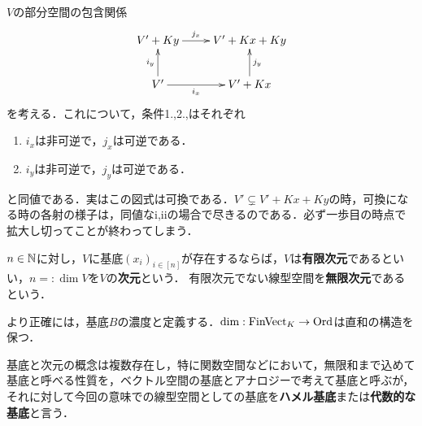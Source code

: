 \documentclass[uplatex, 12pt, dvipdfmx]{jsreport}
\begin{document}
\begin{remark}
    $V$の部分空間の包含関係
    \[\xymatrix{
        V'+Ky\ar[r]^-{j_x}&V'+Kx+Ky\\
        V'\ar[r]_-{i_x}\ar[u]^-{i_y}&V'+Kx\ar[u]_-{j_y}
    }\]
    を考える．これについて，条件1.,2.,はそれぞれ
    \begin{enumerate}[i]
        \item $i_x$は非可逆で，$j_x$は可逆である．
        \item $i_y$は非可逆で，$j_y$は可逆である．
    \end{enumerate}
    と同値である．実はこの図式は可換である．$V'\subsetneq V'+Kx+Ky$の時，可換になる時の各射の様子は，同値なi,iiの場合で尽きるのである．必ず一歩目の時点で拡大し切ってことが終わってしまう．
\end{remark}

\begin{definition}\label{def-dimention}
    $n\in\mathbb{N}$に対し，$V$に基底$(x_i)_{i\in[n]}$が存在するならば，$V$は\textbf{有限次元}であるといい，$n=:\dim V$を$V$の\textbf{次元}という．
    有限次元でない線型空間を\textbf{無限次元}であるという．
\end{definition}
\begin{remark}
    より正確には，基底$B$の濃度と定義する．$\dim:\mathrm{FinVect}_K\to\mathrm{Ord}$は直和の構造を保つ．

    基底と次元の概念は複数存在し，特に関数空間などにおいて，無限和まで込めて基底と呼べる性質を，ベクトル空間の基底とアナロジーで考えて基底と呼ぶが，
    それに対して今回の意味での線型空間としての基底を\textbf{ハメル基底}または\textbf{代数的な基底}と言う．
\end{remark}
\end{document}
